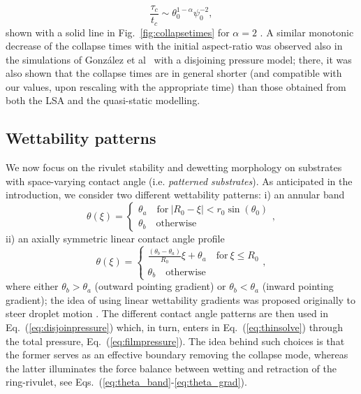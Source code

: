 \documentclass[%
 aip,
 amsmath,amssymb,
 reprint,%
]{revtex4-1}
\begin{document}
\begin{equation}\label{eq:modeltauc}
    \frac{\tau_c}{t_c} \sim  \theta_0^{1-\alpha} \psi_0^{-2},
\end{equation}
shown with a solid line in Fig.~\ref{fig:collapsetimes} for $\alpha=2$ \cite{Popescu2012,Hoffman1975}.
A similar monotonic decrease of the collapse times with the initial aspect-ratio was observed also in the simulations of Gonz\'alez et al~\cite{gonzalezStabilityLiquidRing2013} with a disjoining pressure model; there, it was also shown that the collapse times are in general shorter (and compatible with our values, upon rescaling with the appropriate time) than those obtained from both the LSA and the quasi-static modelling.

\subsection{Wettability patterns}\label{subsec:wettability}
We now focus on the rivulet stability and dewetting morphology on substrates with space-varying contact angle (i.e. {\it patterned substrates}).
As anticipated in the introduction, we consider two different wettability patterns: i) an annular band 
\begin{equation}\label{eq:theta_band}
    \theta(\xi) =\begin{cases}
        \theta_a \quad \text{for}~|R_0-\xi| < r_0\sin(\theta_0) \\
        \theta_b\quad \text{otherwise}
    \end{cases},
\end{equation}
ii) an axially symmetric linear contact angle profile
\begin{equation}\label{eq:theta_grad}
    \theta(\xi) =\begin{cases}
        \frac{(\theta_{b}-\theta_{a})}{R_0} \xi + \theta_{a} \quad \text{for}~\xi \leq R_0 \\
        \theta_b \quad \text{otherwise}
    \end{cases},
\end{equation}
where either $\theta_{b} > \theta_{a}$ (outward pointing gradient) or $\theta_b < \theta_a$ (inward pointing gradient); the idea of using linear wettability gradients was proposed originally to steer droplet motion \cite{Savva_Groves_Kalliadasis_2019}.
The different contact angle patterns are then used in Eq.~(\ref{eq:disjoinpressure}) which, in turn, enters in Eq.~(\ref{eq:thinsolve}) through the total pressure, Eq.~(\ref{eq:filmpressure}).
The idea behind such choices is that the former serves as an effective boundary removing the collapse mode, whereas the latter illuminates the force balance between wetting and retraction of the ring-rivulet, see Eqs.~(\ref{eq:theta_band}-\ref{eq:theta_grad}).
\end{document}
